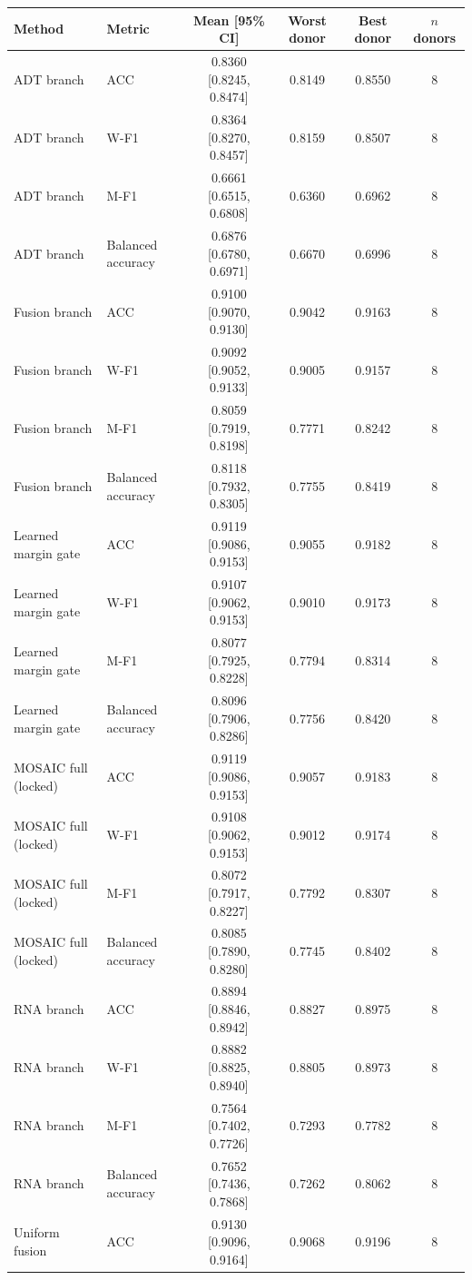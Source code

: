 \begin{tabular}{llcccc}
\toprule
Method & Metric & Mean [95\% CI] & Worst donor & Best donor & $n$ donors \\
\midrule
ADT branch & ACC & 0.8360 [0.8245, 0.8474] & 0.8149 & 0.8550 & 8 \\
ADT branch & W-F1 & 0.8364 [0.8270, 0.8457] & 0.8159 & 0.8507 & 8 \\
ADT branch & M-F1 & 0.6661 [0.6515, 0.6808] & 0.6360 & 0.6962 & 8 \\
ADT branch & Balanced accuracy & 0.6876 [0.6780, 0.6971] & 0.6670 & 0.6996 & 8 \\
Fusion branch & ACC & 0.9100 [0.9070, 0.9130] & 0.9042 & 0.9163 & 8 \\
Fusion branch & W-F1 & 0.9092 [0.9052, 0.9133] & 0.9005 & 0.9157 & 8 \\
Fusion branch & M-F1 & 0.8059 [0.7919, 0.8198] & 0.7771 & 0.8242 & 8 \\
Fusion branch & Balanced accuracy & 0.8118 [0.7932, 0.8305] & 0.7755 & 0.8419 & 8 \\
Learned margin gate & ACC & 0.9119 [0.9086, 0.9153] & 0.9055 & 0.9182 & 8 \\
Learned margin gate & W-F1 & 0.9107 [0.9062, 0.9153] & 0.9010 & 0.9173 & 8 \\
Learned margin gate & M-F1 & 0.8077 [0.7925, 0.8228] & 0.7794 & 0.8314 & 8 \\
Learned margin gate & Balanced accuracy & 0.8096 [0.7906, 0.8286] & 0.7756 & 0.8420 & 8 \\
MOSAIC full (locked) & ACC & 0.9119 [0.9086, 0.9153] & 0.9057 & 0.9183 & 8 \\
MOSAIC full (locked) & W-F1 & 0.9108 [0.9062, 0.9153] & 0.9012 & 0.9174 & 8 \\
MOSAIC full (locked) & M-F1 & 0.8072 [0.7917, 0.8227] & 0.7792 & 0.8307 & 8 \\
MOSAIC full (locked) & Balanced accuracy & 0.8085 [0.7890, 0.8280] & 0.7745 & 0.8402 & 8 \\
RNA branch & ACC & 0.8894 [0.8846, 0.8942] & 0.8827 & 0.8975 & 8 \\
RNA branch & W-F1 & 0.8882 [0.8825, 0.8940] & 0.8805 & 0.8973 & 8 \\
RNA branch & M-F1 & 0.7564 [0.7402, 0.7726] & 0.7293 & 0.7782 & 8 \\
RNA branch & Balanced accuracy & 0.7652 [0.7436, 0.7868] & 0.7262 & 0.8062 & 8 \\
Uniform fusion & ACC & 0.9130 [0.9096, 0.9164] & 0.9068 & 0.9196 & 8 \\

\end{tabular}
